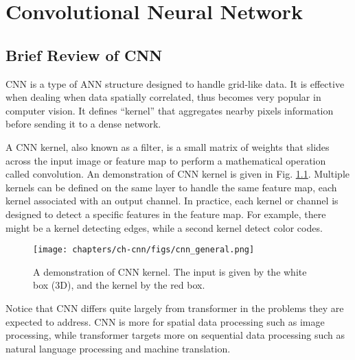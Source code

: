 \chapter{Convolutional Neural Network}

\section{Brief Review of CNN}

CNN is a type of ANN structure designed to handle grid-like data. It is effective when dealing when data spatially correlated, thus becomes very popular in computer vision. It defines ``kernel'' that aggregates nearby pixels information before sending it to a dense network.

A CNN kernel, also known as a filter, is a small matrix of weights that slides across the input image or feature map to perform a mathematical operation called convolution. An demonstration of CNN kernel is given in Fig. \ref{ch:cnn:fig:cnn_kernel}. Multiple kernels can be defined on the same layer to handle the same feature map, each kernel associated with an output channel. In practice, each kernel or channel is designed to detect a specific features in the feature map. For example, there might be a kernel detecting edges, while a second kernel detect color codes.

\begin{figure}
	\centering
	\texttt{[image: chapters/ch-cnn/figs/cnn\_general.png]}
	\caption{A demonstration of CNN kernel. The input is given by the white box (3D), and the kernel by the red box.} \label{ch:cnn:fig:cnn_kernel}
\end{figure}

Notice that CNN differs quite largely from transformer in the problems they are expected to address. CNN is more for spatial data processing such as image processing, while transformer targets more on sequential data processing such as natural language processing and machine translation.
